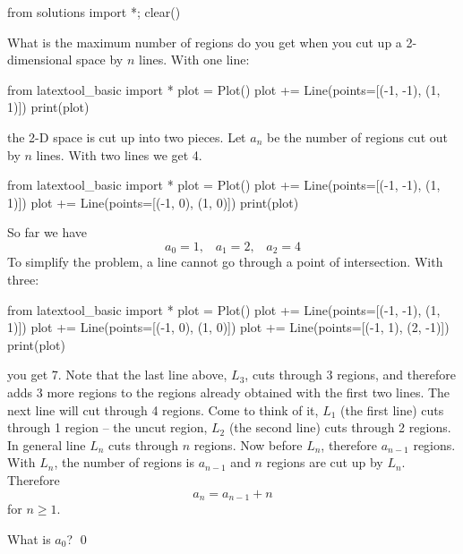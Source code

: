 \begin{python0}
from solutions import *; clear() 
\end{python0}

What is the maximum number of regions do you get when you
cut up a 2-dimensional space by $n$ lines.
With one line:
\begin{python}
from latextool_basic import *
plot = Plot()
plot += Line(points=[(-1, -1), (1, 1)])
print(plot)
\end{python}
the 2-D space is cut up into two pieces.
Let $a_n$ be the number of regions cut out by $n$ lines.
With two lines we get 4.
\begin{python}
from latextool_basic import *
plot = Plot()
plot += Line(points=[(-1, -1), (1, 1)])
plot += Line(points=[(-1, 0), (1, 0)])
print(plot)
\end{python}
So far we have
\[
a_0 = 1, \,\,\,\,\,
a_1 = 2, \,\,\,\,\,
a_2 = 4
\]
To simplify the problem, a line cannot go through a point of
intersection.
With three:
\begin{python}
from latextool_basic import *
plot = Plot()
plot += Line(points=[(-1, -1), (1, 1)])
plot += Line(points=[(-1, 0), (1, 0)])
plot += Line(points=[(-1, 1), (2, -1)])
print(plot)
\end{python}
you get 7.
Note that the last line above, $L_3$, cuts through 3 regions,
and therefore adds 3 more
regions to the regions already obtained with the first two lines.
The next line will cut through 4 regions.
Come to think of it, $L_1$ (the first line) cuts through 1 region --
the uncut region,
$L_2$ (the second line) cuts through
2 regions.
In general line $L_n$ cuts through $n$ regions.
Now before $L_n$, therefore $a_{n-1}$ regions.
With $L_n$, the number of regions is $a_{n-1}$ and
$n$ regions are cut up by $L_n$. 
Therefore
\[
a_n = a_{n-1} + n
\]
for $n \geq 1$.


\newpage
\begin{ex}
What is $a_0$?
\qed
\end{ex}

